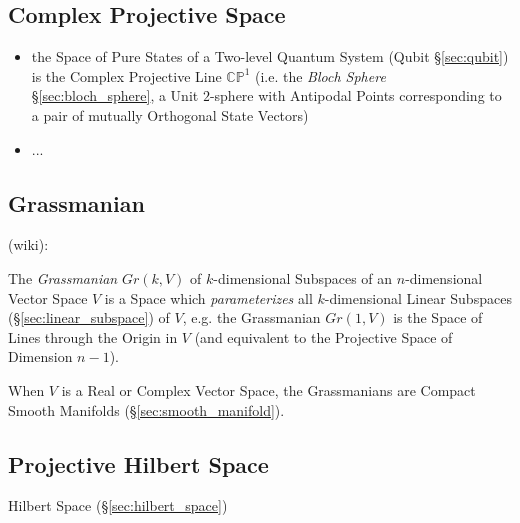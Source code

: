 \subsection{Complex Projective Space}\label{sec:complex_projective_space}

\begin{itemize}
  \item the Space of Pure States of a Two-level Quantum System (Qubit
    \S\ref{sec:qubit}) is the Complex Projective Line $\mathbb{CP}^1$ (i.e. the
    \emph{Bloch Sphere} \S\ref{sec:bloch_sphere}, a Unit $2$-sphere with
    Antipodal Points corresponding to a pair of mutually Orthogonal State
    Vectors)
  \item ...
\end{itemize}



\subsection{Grassmanian}\label{sec:grassmanian}

(wiki):

The \emph{Grassmanian} $Gr(k,V)$ of $k$-dimensional Subspaces of an
$n$-dimensional Vector Space $V$ is a Space which \emph{parameterizes} all
$k$-dimensional Linear Subspaces (\S\ref{sec:linear_subspace}) of $V$, e.g.
the Grassmanian $Gr(1,V)$ is the Space of Lines through the Origin in $V$ (and
equivalent to the Projective Space of Dimension $n-1$).

When $V$ is a Real or Complex Vector Space, the Grassmanians are Compact Smooth
Manifolds (\S\ref{sec:smooth_manifold}).



\subsection{Projective Hilbert Space}\label{sec:projective_hilbert_space}

Hilbert Space (\S\ref{sec:hilbert_space})

